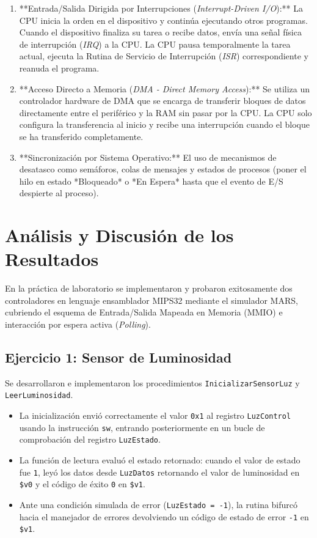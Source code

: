 \documentclass[12pt, letterpaper]{article}
\begin{document}
\begin{enumerate}
    \item **Entrada/Salida Dirigida por Interrupciones (\textit{Interrupt-Driven I/O}):** La CPU inicia la orden en el dispositivo y continúa ejecutando otros programas. Cuando el dispositivo finaliza su tarea o recibe datos, envía una señal física de interrupción (\textit{IRQ}) a la CPU. La CPU pausa temporalmente la tarea actual, ejecuta la Rutina de Servicio de Interrupción (\textit{ISR}) correspondiente y reanuda el programa.
    \item **Acceso Directo a Memoria (\textit{DMA - Direct Memory Access}):** Se utiliza un controlador hardware de DMA que se encarga de transferir bloques de datos directamente entre el periférico y la RAM sin pasar por la CPU. La CPU solo configura la transferencia al inicio y recibe una interrupción cuando el bloque se ha transferido completamente.
    \item **Sincronización por Sistema Operativo:** El uso de mecanismos de desatasco como semáforos, colas de mensajes y estados de procesos (poner el hilo en estado *Bloqueado* o *En Espera* hasta que el evento de E/S despierte al proceso).
\end{enumerate}

\newpage

\section{Análisis y Discusión de los Resultados}

En la práctica de laboratorio se implementaron y probaron exitosamente dos controladores en lenguaje ensamblador MIPS32 mediante el simulador MARS, cubriendo el esquema de Entrada/Salida Mapeada en Memoria (MMIO) e interacción por espera activa (\textit{Polling}).

\subsection{Ejercicio 1: Sensor de Luminosidad}
Se desarrollaron e implementaron los procedimientos \texttt{InicializarSensorLuz} y \texttt{LeerLuminosidad}.
\begin{itemize}
    \item La inicialización envió correctamente el valor \texttt{0x1} al registro \texttt{LuzControl} usando la instrucción \texttt{sw}, entrando posteriormente en un bucle de comprobación del registro \texttt{LuzEstado}.
    \item La función de lectura evaluó el estado retornado: cuando el valor de estado fue \texttt{1}, leyó los datos desde \texttt{LuzDatos} retornando el valor de luminosidad en \texttt{\$v0} y el código de éxito \texttt{0} en \texttt{\$v1}.
    \item Ante una condición simulada de error (\texttt{LuzEstado = -1}), la rutina bifurcó hacia el manejador de errores devolviendo un código de estado de error \texttt{-1} en \texttt{\$v1}.
\end{itemize}
\end{document}
